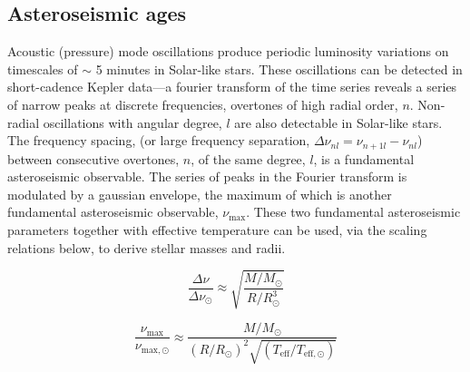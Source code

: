 \documentclass[10pt,preprint]{aastex}
\begin{document}
\subsection{Asteroseismic ages}
\label{sec:asteroseismic_targets}

Acoustic (pressure) mode oscillations produce periodic luminosity variations on timescales of $\sim$ 5 minutes in Solar-like stars.
These oscillations can be detected in short-cadence Kepler data---a fourier transform of the time series reveals a series of narrow peaks at discrete frequencies, overtones of high radial order, $n$.
Non-radial oscillations with angular degree, $l$ are also detectable in Solar-like stars.
The frequency spacing, (or large frequency separation, $\Delta\nu_{nl} = \nu_{n+1l}-\nu_{nl}$) between consecutive overtones, $n$, of the same degree, $l$, is a fundamental asteroseismic observable.
The series of peaks in the Fourier transform is modulated by a gaussian envelope, the maximum of which is another fundamental asteroseismic observable, $\nu_{\mathrm{max}}$.
These two fundamental asteroseismic parameters together with effective temperature can be used, via the scaling relations below, to derive stellar masses and radii.

\begin{equation}
\frac{\Delta\nu}{\Delta\nu_{\odot}} \approx \sqrt{\frac{M/M_{\odot}}{R/R_{\odot}^3}}
\label{eq:delta_nu}
\end{equation}

\begin{equation}
\frac{\nu_{\mathrm{max}}}{\nu_{\mathrm{max},\odot}} \approx \frac{M/M_{\odot}}{(R/R_{\odot})^2\sqrt{(T_{\mathrm{eff}}/T_{\mathrm{eff},\odot})}}
\label{eq:delta_nu}
\end{equation}
\end{document}
